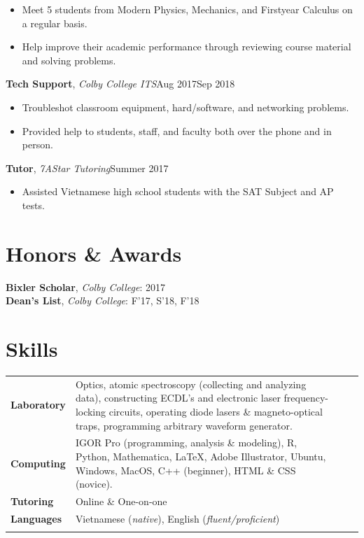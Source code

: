 \documentclass[a4paper, 10.5pt]{article}
\begin{document}
	\begin{itemize}[noitemsep, nolistsep]
		\setlength{\itemindent}{0.2in}
		\item Meet 5 students from Modern Physics, Mechanics, and First\textendash year Calculus on a regular basis.
		\item Help improve their academic performance through reviewing course material and solving problems.\\
	\end{itemize}
	\indent \indent \textbf{Tech Support}, \textit{Colby College ITS}\hfill Aug 2017\textemdash Sep 2018
	\begin{itemize}[noitemsep, nolistsep]
		\setlength{\itemindent}{0.2in}
		\item Troubleshot classroom equipment, hard/software, and networking problems.
		\item Provided help to students, staff, and faculty both over the phone and in person.\\
	\end{itemize}
	\indent \indent \textbf{Tutor}, \textit{7AStar Tutoring}\hfill Summer 2017
	\begin{itemize}[noitemsep, nolistsep]
		\setlength{\itemindent}{0.2in}
		\item Assisted Vietnamese high school students with the SAT Subject and AP tests.\\
	\end{itemize}

	\section*{\normalsize{{\color{colby}Honors \& Awards}}}
	\indent \textbf{Bixler Scholar}, \textit{Colby College}: 2017\\
	\indent \textbf{Dean's List}, \textit{Colby College}: F'17, S'18, F'18\\
	
	\section*{\normalsize{{\color{colby}Skills}}}
		\begin{tabular}{lp{13.5cm}lp{8in}}
			
			\textbf{Laboratory} & Optics, atomic spectroscopy (collecting and analyzing data), constructing ECDL's and electronic laser frequency-locking circuits, operating diode lasers \& magneto-optical traps, programming arbitrary waveform generator.\\
			
			\textbf{Computing} & IGOR Pro (programming, analysis \& modeling), R, Python, Mathematica, \LaTeX{}, Adobe Illustrator, Ubuntu, Windows, MacOS, C++ (beginner), HTML \& CSS (novice).\\
			
			\textbf{Tutoring} & Online \& One-on-one\\
			
			\textbf{Languages} & Vietnamese (\textit{native}), English (\textit{fluent/proficient})\\\\
			
		\end{tabular}
	
\end{document}
